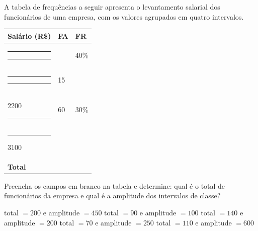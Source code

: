 A tabela de frequências a seguir apresenta o levantamento salarial dos funcionários de uma empresa, com os valores agrupados em quatro intervalos.

\renewcommand{\arraystretch}{1.3} %
\noindent\begin{tabular}{|C{28mm}|C{9mm}|C{9mm}|}
\hline
{} 
\textbf{\color{white}Salário (R\$)} & 
\textbf{\color{white}FA} & 
\textbf{\color{white}FR} \\ \hline
\rule{8mm}{0pt}  \rule{8mm}{0pt} & & 40\% \\ \hline
\rule{8mm}{0pt}  \rule{8mm}{0pt} & 15 & \\ \hline
2200  \rule{8mm}{0pt} &60 &30\%\\\hline
\rule{8mm}{0pt}  3100 &&\\\hline
\textbf{Total} & &  \\ \hline
\end{tabular}

Preencha os campos em branco na tabela e determine: qual é o total de funcionários da empresa e qual é a amplitude dos intervalos de classe?

total $=200$ e amplitude $=450$
total $=90$ e amplitude $=100$
total $=140$ e amplitude $=200$
total $=70$ e amplitude $=250$
total $=110$ e amplitude $=600$
